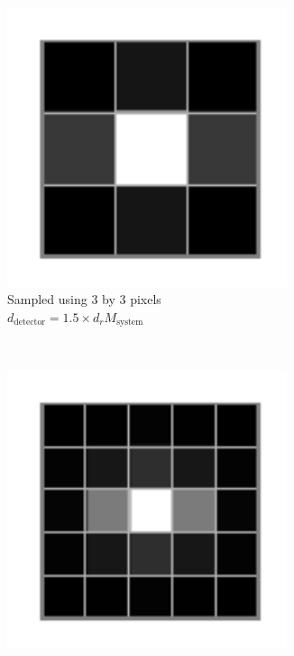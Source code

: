 \begin{figure}
    \ContinuedFloat
    \centering
      \begin{subfigure}[t]{0.4\textwidth}
        \centering
        \includegraphics[width=0.9\textwidth]{./sampling/digital_airy_sample_3}
        \caption{Sampled using 3 by 3 pixels\\\(d_{\text{detector}} = 1.5 \times  d_{r}M_{\text{system}}\)}
        \label{fig:digital_airy_sample_3}
    \end{subfigure}~
    \begin{subfigure}[t]{0.4\textwidth}
        \centering
        \includegraphics[width=0.9\textwidth]{./sampling/digital_airy_sample_5}

\end{subfigure}
\end{figure}

